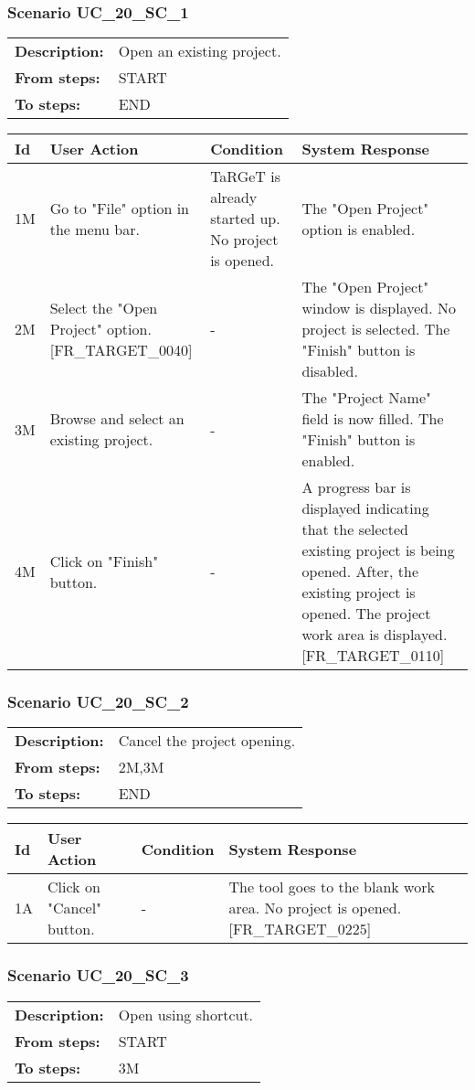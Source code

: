 \documentclass[a4paper,11pt]{article}
\newcommand{\bl}{\\ \hline}
\begin{document}
\subsubsection*{Scenario UC_20_SC_1}
\begin{tabular}{p{1in}p{4in}}
{\bf Description:} & Open an existing project. \\
{\bf From steps:} & START \\
{\bf To steps:} & END \\
\end{tabular}
 
\begin{tabular}{|p{0.8in}|p{1.6in}|p{1.6in}|p{1.6in}|}
\hline
Id & User Action & Condition & System Response  \bl 
1M & Go to "File" option in the menu bar. & TaRGeT is already started up. No project is opened. & The "Open Project" option is enabled. \bl 
2M & Select the "Open Project" option. [FR_TARGET_0040] & - & The "Open Project" window is displayed. No project is selected. The "Finish" button is disabled. \bl 
3M & Browse and select an existing project. & - & The "Project Name" field is now filled. The "Finish" button is enabled. \bl 
4M & Click on "Finish" button. & - & A progress bar is displayed indicating that the selected existing project is being opened. After, the existing project is opened. The project work area is displayed. [FR_TARGET_0110] \bl 
\end{tabular}
\subsubsection*{Scenario UC_20_SC_2}
\begin{tabular}{p{1in}p{4in}}
{\bf Description:} & Cancel the project opening. \\
{\bf From steps:} & 2M,3M \\
{\bf To steps:} & END \\
\end{tabular}
 
\begin{tabular}{|p{0.8in}|p{1.6in}|p{1.6in}|p{1.6in}|}
\hline
Id & User Action & Condition & System Response  \bl 
1A & Click on "Cancel" button. & - & The tool goes to the blank work area. No project is opened. [FR_TARGET_0225] \bl 
\end{tabular}
\subsubsection*{Scenario UC_20_SC_3}
\begin{tabular}{p{1in}p{4in}}
{\bf Description:} & Open using shortcut. \\
{\bf From steps:} & START \\
{\bf To steps:} & 3M \\
\end{tabular}
 
\end{document}
